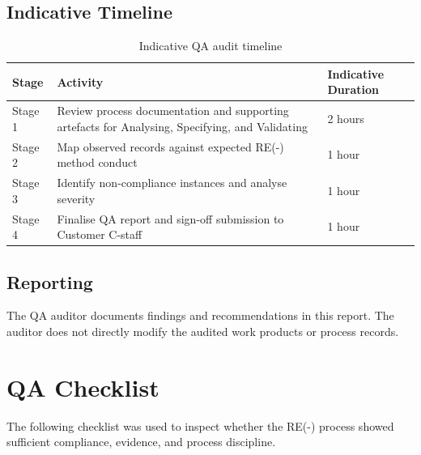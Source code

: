 \documentclass[11pt,a4paper]{article}
\begin{document}
\subsection{Indicative Timeline}

\begin{table}[H]
\centering
\small
\renewcommand{\arraystretch}{1.4}
\begin{tabularx}{\textwidth}{|p{}|p{}|X|}
\hline
\rowcolor{tableheader}
\textbf{Stage} & \textbf{Activity} & \textbf{Indicative Duration} \\
\hline
Stage 1 & Review process documentation and supporting artefacts for Analysing, Specifying, and Validating & 2 hours \\
\hline
Stage 2 & Map observed records against expected RE(-) method conduct & 1 hour \\
\hline
Stage 3 & Identify non-compliance instances and analyse severity & 1 hour \\
\hline
Stage 4 & Finalise QA report and sign-off submission to Customer C-staff & 1 hour \\
\hline
\end{tabularx}
\caption{Indicative QA audit timeline}
\label{tab:qa-timeline}
\end{table}

\subsection{Reporting}

The QA auditor documents findings and recommendations in this report. The auditor does not directly modify the audited work products or process records.


\section{QA Checklist}

The following checklist was used to inspect whether the RE(-) process showed sufficient compliance, evidence, and process discipline.
\end{document}
